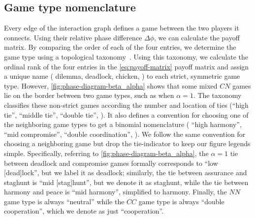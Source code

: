 \documentclass[10pt,letterpaper]{article}
\begin{document}
\subsection{Game type nomenclature}
\label{sec:game-type-nomenclature}
Every edge of the interaction graph
defines a game between the two players it connects.
Using their relative phase difference $\Delta \phi$,
we can calculate the payoff matrix.
By comparing the order of each of the four entries,
we determine the game type using
a topological taxonomy~\cite{bruns2015names}.
Using this taxonomy, we calculate the ordinal rank of the four entries
in the \cref{eq:payoff-matrix} payoff matrix
and assign a unique name (\eg{} dilemma, deadlock, chicken, \etc{})
to each strict, symmetric game type.
However, \cref{fig:phase-diagram-beta_alpha}
shows that some mixed $CN$ games lie on the border between two game types,
such as when $\alpha = 1$.
The taxonomy~\cite{bruns2015names} classifies these non-strict games
according the number and location of ties (``high tie'', ``middle tie'',
``double tie'', \etc{}).
It also defines a convention for choosing one of the neighboring game types
to get a binomial nomenclature (\eg{} ``high harmony'', ``mid compromise'',
``double coordination'', \etc{}).
We follow the same convention for choosing a neighboring game
but drop the tie-indicator to keep our figure legends simple.
Specifically, referring to \cref{fig:phase-diagram-beta_alpha},
the $\alpha = 1$ tie between deadlock and compromise games
formally corresponds to ``low [dead]lock'',
but we label it as deadlock;
similarly, the tie between assurance and staghunt
is ``mid [stag]hunt'', but we denote it as staghunt,
while the tie between harmony and peace
is ``mid harmony'', simplified to harmony.
Finally, the $NN$ game type is always ``neutral''
while the $CC$ game type is always ``double cooperation'',
which we denote as just ``cooperation''.
\end{document}
